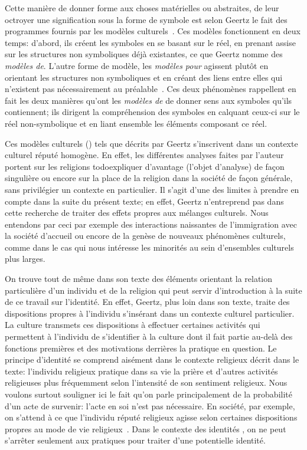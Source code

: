 Cette manière de donner forme aux choses matérielles ou abstraites, de leur octroyer une signification sous la forme de symbole est selon Geertz le fait des programmes fournis par les modèles culturels~\citep[25]{Geertz1972}.
Ces modèles fonctionnent en deux temps: d'abord, ils créent les symboles en se basant sur le réel, en prenant assise sur les structures non symboliques déjà existantes, ce que Geertz nomme des \emph{modèles de}.
L'autre forme de modèle, les \emph{modèles pour} agissent plutôt en orientant les structures non symboliques et en créant des liens entre elles qui n'existent pas nécessairement au préalable~\citep[26--27]{Geertz1972}.
Ces deux phénomènes rappellent en fait les deux manières qu'ont les \emph{modèles de} de donner sens aux symboles qu'ils contiennent; ils dirigent la compréhension des symboles en calquant ceux-ci sur le réel non-symbolique et en liant ensemble les éléments composant ce réel.

Ces modèles culturels () tels que décrits par Geertz s'inscrivent dans un contexte culturel réputé homogène.
En effet, les différentes analyses faites par l'auteur portent sur les religions todo{expliquer d'avantage} (l'objet d'analyse) de façon singulière ou encore sur la place de la religion dans la société de façon générale, sans privilégier un contexte en particulier.
Il s'agit d'une des limites à prendre en compte dans la suite du présent texte; en effet, Geertz n'entreprend pas dans cette recherche de traiter des effets propres aux mélanges culturels.
Nous entendons par ceci par exemple des interactions naissantes de l'immigration avec la société d'accueil ou encore de la genèse de nouveaux phénomènes culturels, comme dans le cas qui nous intéresse les minorités \lgbt{} au sein d'ensembles culturels plus larges.

On trouve tout de même dans son texte des éléments orientant la relation particulière d'un individu et de la religion qui peut servir d'introduction à la suite de ce travail sur l'identité.
En effet, Geertz, plus loin dans son texte, traite des dispositions propres à l'individu s'insérant dans un contexte culturel particulier.
La culture transmets ces dispositions à effectuer certaines activités qui permettent à l'individu de s'identifier à la culture dont il fait partie au-delà des fonctions premières et des motivations derrières la pratique en question.
Le principe d'identité se comprend aisément dans le contexte religieux décrit dans le texte: l'individu religieux pratique dans sa vie la prière et d'autres activités religieuses plus fréquemment selon l'intensité de son sentiment religieux.
Nous voulons surtout souligner ici le fait qu'on parle principalement de la probabilité d'un acte de survenir: l'acte en soi n'est pas nécessaire.
En société, par exemple, on s'attend à ce que l'individu réputé religieux agisse selon certaines dispositions propres au mode de vie religieux~\citep[28--30]{Geertz1972}.
Dans le contexte des identités \lgbt{}, on ne peut s'arrêter seulement aux pratiques pour traiter d'une potentielle identité.

